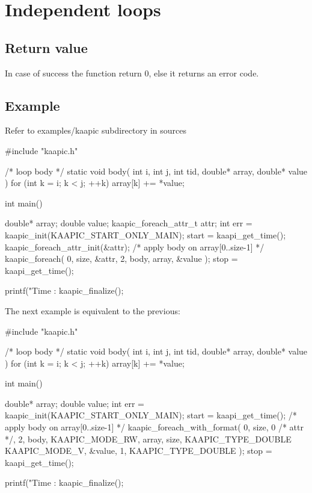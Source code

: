 \documentclass[a4paper, 11pt]{article}
\makeatletter
\newenvironment{apisection}[2][noshortnameprovided]{%
  \newpage
  \section{#2}
  \label{api@#1}
  \newcommand{\api@newpart}[4][noshortpartnameprovided]{%
    \newenvironment{##1}{%
      \subsection{##2}%
      \label{api@#1@##1}%
      ##3%
    }{##4}%
  }%
  \api@newpart[synopsis]{Synopsis}{}{}%
  \api@newpart[desc]{Description}{}{}%
  \api@newpart[params]{Parameters}{%
    \let\api@indesc\@empty
    \newcommand{\param}[1]{%
      \def\api@indesc{yes}%
      \begin{description}%
        \renewcommand{\param}[1]{\item[########1]}%
      \item[####1]
      }%
      \newenvironment{parameters}{%
        \begin{description}%
          \renewcommand{\param}[1]{\item[########1]}%
        }{%
        \end{description}%
      }
    }{%
      \ifx\api@indesc\@empty\relax\else%
    \end{description}%
    \fi%
  }%
  \api@newpart[ret]{Return value}{%
    \newcommand{\otherret}{\par\medskip\noindent}%
  }{}%
  \api@newpart[example]{Example}{}{}%
}{}
\makeatother
\begin{document}
\begin{apisection}[loop]{Independent loops}
  \begin{ret}
    In case of success the function return 0, else it returns an error
    code.
  \end{ret}
  \begin{example}
    Refer to examples/kaapic subdirectory in sources\\

    \begin{code}
  #include "kaapic.h"

  /* loop body */
  static void body(
    int i, int j, int tid, double* array, double* value
  ) 
  {
    for (int k = i; k < j; ++k)
      array[k] += *value;
  }

  int main()
  {
    double* array;
    double value;
    kaapic_foreach_attr_t attr;
    int err = kaapic_init(KAAPIC_START_ONLY_MAIN);
    start = kaapi_get_time(); 
    kaapic_foreach_attr_init(&attr);
    /* apply body on array[0..size-1] */
    kaapic_foreach( 0, size, &attr, 2, body, array, &value );
    stop = kaapi_get_time(); 

    printf("Time : %
    kaapic_finalize();
  }
    \end{code}

    The next example is equivalent to the previous:
    \begin{code}
  #include "kaapic.h"

  /* loop body */
  static void body(
    int i, int j, int tid, double* array, double* value
  ) 
  {
    for (int k = i; k < j; ++k)
      array[k] += *value;
  }

  int main()
  {
    double* array;
    double value;
    int err = kaapic_init(KAAPIC_START_ONLY_MAIN);
    start = kaapi_get_time(); 
    /* apply body on array[0..size-1] */
    kaapic_foreach_with_format( 0, size, 0 /* attr */, 2, body, 
        KAAPIC_MODE_RW, array, size, KAAPIC_TYPE_DOUBLE
        KAAPIC_MODE_V, &value, 1,  KAAPIC_TYPE_DOUBLE
    );
    stop = kaapi_get_time(); 

    printf("Time : %
    kaapic_finalize();
  }
    \end{code}
  \end{example}
\end{apisection}
\end{document}
